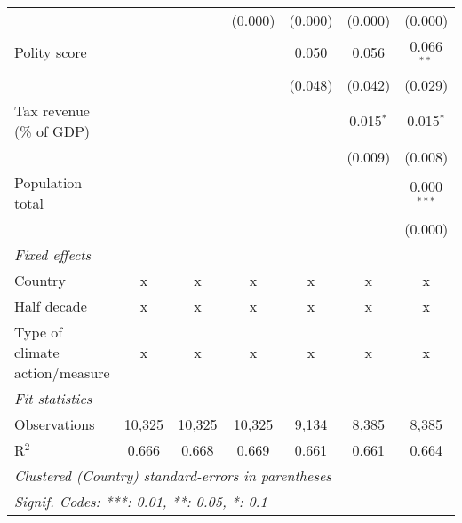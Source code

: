 \begin{tabular}{lcccccc}
                                                                              &             &                & (0.000)        & (0.000)        & (0.000)        & (0.000)\\   
   Polity score                                                               &             &                &                & 0.050          & 0.056          & 0.066$^{**}$\\   
                                                                              &             &                &                & (0.048)        & (0.042)        & (0.029)\\   
   Tax revenue (\% of GDP)                                                    &             &                &                &                & 0.015$^{*}$    & 0.015$^{*}$\\   
                                                                              &             &                &                &                & (0.009)        & (0.008)\\   
   Population total                                                           &             &                &                &                &                & 0.000$^{***}$\\   
                                                                              &             &                &                &                &                & (0.000)\\   
   \emph{Fixed effects}\\
   Country                                                                    & x           & x              & x              & x              & x              & x\\  
   Half decade                                                                & x           & x              & x              & x              & x              & x\\  
   Type of climate action/measure                                             & x           & x              & x              & x              & x              & x\\  
   \midrule \emph{Fit statistics}\\
   Observations                                                               & 10,325      & 10,325         & 10,325         & 9,134          & 8,385          & 8,385\\  
   R$^2$                                                                      & 0.666       & 0.668          & 0.669          & 0.661          & 0.661          & 0.664\\  
   \midrule
   \multicolumn{7}{l}{\emph{Clustered (Country) standard-errors in parentheses}}\\
   \multicolumn{7}{l}{\emph{Signif. Codes: ***: 0.01, **: 0.05, *: 0.1}}\\
\end{tabular}
\par\endgroup


